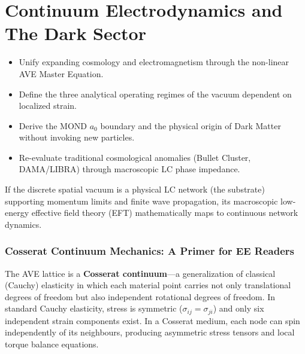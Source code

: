 \chapter{Continuum Electrodynamics and The Dark Sector}
\label{ch:electrodynamics}

\begin{objectivebox}
\begin{itemize}
    \item Unify expanding cosmology and electromagnetism through the non-linear AVE Master Equation.
    \item Define the three analytical operating regimes of the vacuum dependent on localized strain.
    \item Derive the MOND $a_0$ boundary and the physical origin of Dark Matter without invoking new particles.
    \item Re-evaluate traditional cosmological anomalies (Bullet Cluster, DAMA/LIBRA) through macroscopic LC phase impedance.
\end{itemize}
\end{objectivebox}

If the discrete spatial vacuum is a physical LC network (the substrate) supporting momentum limits and finite wave propagation, its macroscopic low-energy effective field theory (EFT) mathematically maps to continuous network dynamics. 

\subsection*{Cosserat Continuum Mechanics: A Primer for EE Readers}
\label{sec:cosserat_primer}

The AVE lattice is a \textbf{Cosserat continuum}---a generalization of classical (Cauchy) elasticity in which each material point carries not only translational degrees of freedom but also independent rotational degrees of freedom. In standard Cauchy elasticity, stress is symmetric ($\sigma_{ij} = \sigma_{ji}$) and only six independent strain components exist. In a Cosserat medium, each node can spin independently of its neighbours, producing asymmetric stress tensors and local torque balance equations.

